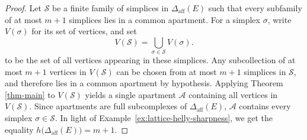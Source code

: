 \documentclass[12pt]{amsart}
\theoremstyle{definition}
\theoremstyle{remark}
\begin{document}
\begin{proof}
Let $\mathcal{S}$ be a finite family of simplices in $\Delta_{\mathrm{aff}}(E)$ such that every subfamily of at most $m+1$ simplices lies in a common apartment. For a simplex $\sigma$, write $V(\sigma)$ for its set of vertices, and set
\[
  V(\mathcal S)=\bigcup_{\sigma\in\mathcal S}V(\sigma).
\]
to be the set of all vertices appearing in these simplices. Any subcollection of at most $m+1$ vertices in $V(\mathcal{S})$ can be chosen from at most $m+1$ simplices in $\mathcal{S}$, and therefore lies in a common apartment by hypothesis. Applying Theorem \ref{thm-main} to $V(\mathcal{S})$ yields a single apartment $\mathcal{A}$ containing all vertices in $V(\mathcal{S})$. Since apartments are full subcomplexes of $\Delta_{\mathrm{aff}}(E)$, $\mathcal{A}$ contains every simplex $\sigma \in \mathcal{S}$. In light of Example~\ref{ex:lattice-helly-sharpness}, we get the equality  $h\bigl(\Delta_{\mathrm{aff}}(E)\bigr) = m+1$.

\end{proof}
\end{document}
